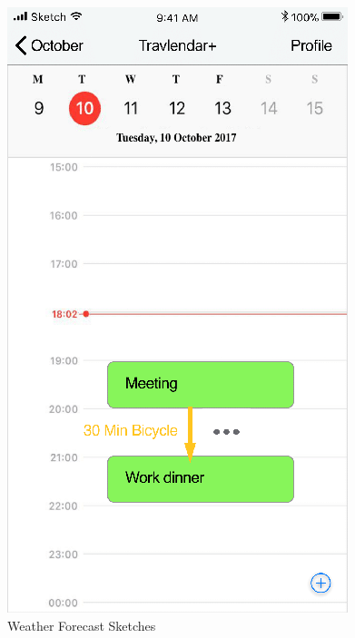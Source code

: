 \begin{figure}[H]
	\includegraphics[scale=0.23]{Images/Interface/Weather_Forecast/2_rain}
	\caption{Weather Forecast Sketches}
\end{figure}

